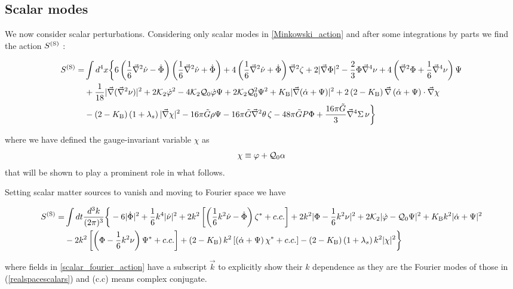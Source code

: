 \documentclass[twocolumn,prd,preprintnumbers,amsmath,amssymb,nofootinbib,superscriptaddress]{revtex4-1}
\newcommand{\scal}{\ensuremath{{\rm S}}}
\newcommand{\grad}{\ensuremath{\vec{\nabla}}}
\newcommand{\lambdas}{\lambda_s}
\newcommand{\Kcal}{{\cal K}}
\newcommand{\Qcal}{{\cal Q}}
\newcommand{\Gt}{\ensuremath{\tilde{G}}}
\newcommand{\KB}{\ensuremath{K_{{\rm B}}}}
\begin{document}
\subsection{Scalar modes}

We now consider scalar perturbations. Considering only scalar modes in \eqref{Minkowski_action} and after some integrations by parts we find the action $S^{(\scal)}$ :    
\begin{widetext}
\begin{align}
S^{(\scal)} =& \int d^4x  \bigg\{
6 \left( \frac{1}{6} \grad^2\dot{\nu}     - \dot{\Phi} \right) \left( \frac{1}{6} \grad^2\dot{\nu}     + \dot{\Phi} \right)
+ 4 \left(  \frac{1}{6} \grad^2\dot{\nu}  +  \dot{\Phi} \right) \grad^2\zeta
+ 2 |\grad\Phi|^2 - \frac{2}{3}\Phi \grad^4\nu 
+ 4\left( \grad^2\Phi  + \frac{1}{6} \grad^4\nu\right) \Psi
\nonumber
\\
&
+ \frac{1}{18}  |\grad (\grad^2\nu)|^2
+2 \Kcal_2 \dot{\varphi}^2 
 -  4 \Kcal_2   \Qcal_0  \dot{\varphi}  \Psi
 +  2 \Kcal_2  \Qcal_0^2  \Psi^2 
 + \KB  |\grad (\dot{\alpha} + \Psi)|^2 
+ 2 \left(2 - \KB\right)   \grad\left( \dot{\alpha}  +   \Psi  \right) \cdot \grad \chi
\nonumber 
\\
&
- \left(2-\KB\right)\left(1 + \lambdas \right) |\grad\chi|^2  
- 16\pi \Gt \rho \Psi
- 16\pi \Gt  \grad^2 \theta \, \zeta
- 48\pi \Gt  P  \Phi
+ \frac{16\pi \Gt }{3} \grad^4\Sigma   \, \nu
\bigg\}
\label{realspacescalars}
\end{align}
\end{widetext}
where we have defined the gauge-invariant variable $\chi$ as
\begin{equation}
\chi \equiv \varphi + \Qcal_0 \alpha
\end{equation}
that will be shown to play a prominent role in what follows.


Setting scalar matter sources to vanish and moving to Fourier space we have
\begin{widetext}
\begin{align}
S^{(\scal)} =& \int dt \frac{d^3k}{(2\pi)^3}  \bigg\{
    - 6 |\dot{\Phi}|^2
+   \frac{1}{6} k^4 |\dot{\nu}|^2
+ 2 k^2  \left[ 
\left(  \frac{1}{6} k^2\dot{\nu}  -  \dot{\Phi} \right) \zeta^*
+ c.c. %
\right]
+ 2 k^2 |\Phi - \frac{1}{6} k^2 \nu |^2
+2 \Kcal_2 |\dot{\varphi}  -  \Qcal_0 \Psi|^2 
 + \KB k^2  |\dot{\alpha} + \Psi|^2 
\nonumber
\\
&
- 2k^2 \left[ \left( \Phi  - \frac{1}{6} k^2\nu\right) \Psi^*  + c.c.
\right]
+ \left(2 - \KB\right)   k^2 \left[ \left( \dot{\alpha}  +   \Psi  \right) \chi^* 
+ c.c.
\right]
- \left(2-\KB\right)\left(1 + \lambdas \right) k^2 |\chi|^2  
\bigg\}
\label{scalar_fourier_action}
\end{align}
\end{widetext}
where fields in \eqref{scalar_fourier_action} have a subscript $\vec{k}$ to explicitly 
show their $k$ dependence as they are 
the Fourier modes of those in (\ref{realspacescalars}) and (c.c) means complex conjugate.
\end{document}
